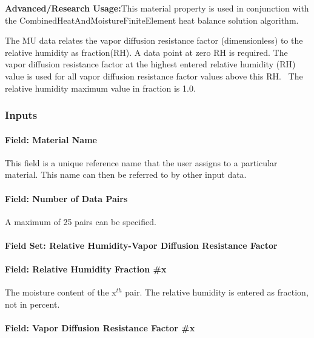 \textbf{Advanced/Research Usage:}This material property is used in conjunction with the CombinedHeatAndMoistureFiniteElement heat balance solution algorithm.

The MU data relates the vapor diffusion resistance factor (dimensionless) to the relative humidity as fraction(RH). A data point at zero RH is required. The vapor diffusion resistance factor at the highest entered relative humidity (RH) value is used for all vapor diffusion resistance factor values above this RH.~ The relative humidity maximum value in fraction is 1.0.

\subsubsection{Inputs}\label{inputs-11-019}

\paragraph{Field: Material Name}\label{field-material-name-4}

This field is a unique reference name that the user assigns to a particular material. This name can then be referred to by other input data.

\paragraph{Field: Number of Data Pairs}\label{field-number-of-data-pairs}

A maximum of 25 pairs can be specified.

\paragraph{Field Set: Relative Humidity-Vapor Diffusion Resistance Factor}\label{field-set-relative-humidity-vapor-diffusion-resistance-factor}

\paragraph{Field: Relative Humidity Fraction \#x}\label{field-relative-humidity-fraction-x-1}

The moisture content of the x\(^{th}\) pair. The relative humidity is entered as fraction, not in percent.

\paragraph{Field: Vapor Diffusion Resistance Factor \#x}\label{field-vapor-diffusion-resistance-factor-x}

